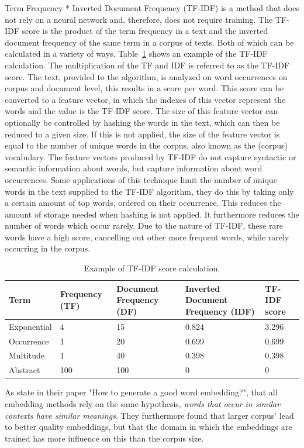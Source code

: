 \documentclass[../../Thesis.tex]{subfiles}
\begin{document}
\begin{jumpin}
Term Frequency * Inverted Document Frequency (TF-IDF) is a method that does not rely on a neural network and, therefore, does not require training. The TF-IDF score is the product of the term frequency in a text and the inverted document frequency of the same term in a corpus of texts. Both of which can be calculated in a variety of ways. Table~\ref{table:TFIDFScore} shows an example of the TF-IDF calculation. The multiplication of the TF and IDF is referred to as the TF-IDF score. The text, provided to the algorithm, is analyzed on word occurrences on corpus and document level, this results in a score per word. This score can be converted to a feature vector, in which the indexes of this vector represent the words and the value is the TF-IDF score. The size of this feature vector can optionally be controlled by hashing the words in the text, which can then be reduced to a given size. If this is not applied, the size of the feature vector is equal to the number of unique words in the corpus, also known as the (corpus) vocabulary.  The feature vectors produced by TF-IDF do not capture syntactic or semantic information about words, but capture information about word occurrences. Some applications of this technique limit the number of unique words in the text supplied to the TF-IDF algorithm, they do this by taking only a certain amount of top words, ordered on their occurrence. This reduces the amount of storage needed when hashing is not applied. It furthermore reduces the number of words which occur rarely. Due to the nature of TF-IDF, these rare words have a high score, cancelling out other more frequent words, while rarely occurring in the corpus.
\vspace{0.3in}\begin{table}[hbt]
\begin{center}
\begin{tabular}{|p{1in}|p{1in}|p{1in}|p{1.3in}|p{1in}|}
\hline
Term & Frequency (TF) & Document Frequency (DF) & Inverted Document Frequency (IDF) & TF-IDF score\\
\hline
Exponential & 4 & 15 & 0.824 & 3.296\\
\hline
Occurrence & 1 & 20 & 0.699 & 0.699\\
\hline
Multitude & 1 & 40 & 0.398 & 0.398\\
\hline
Abstract & 100 & 100 & 0 & 0\\
\hline
\end{tabular}
\caption{Example of TF-IDF score calculation.}\label{table:TFIDFScore}
\end{center}
\end{table}
\FloatBarrier
\end{jumpin}
As \citet{lai2016generate} state in their paper "How to generate a good word embedding?", that all embedding methods rely on the same hypothesis, \textit{words that occur in similar contexts have similar meanings}. They furthermore found that larger corpus' lead to better quality embeddings, but that the domain in which the embeddings are trained has more influence on this than the corpus size. 
\end{document}
